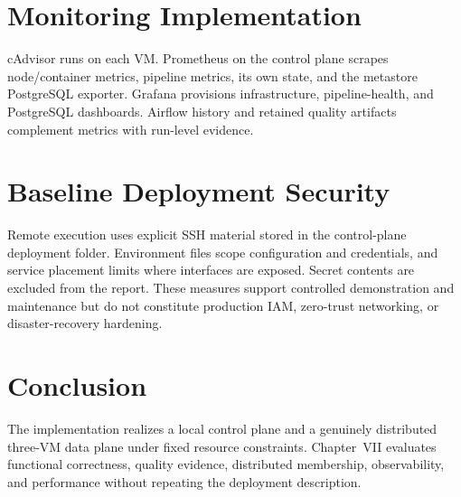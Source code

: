 \section{Monitoring Implementation}
cAdvisor runs on each VM. Prometheus on the control plane scrapes node/container metrics, pipeline metrics, its own state, and the metastore PostgreSQL exporter. Grafana provisions infrastructure, pipeline-health, and PostgreSQL dashboards. Airflow history and retained quality artifacts complement metrics with run-level evidence.

\section{Baseline Deployment Security}
Remote execution uses explicit SSH material stored in the control-plane deployment folder. Environment files scope configuration and credentials, and service placement limits where interfaces are exposed. Secret contents are excluded from the report. These measures support controlled demonstration and maintenance but do not constitute production IAM, zero-trust networking, or disaster-recovery hardening.

\section{Conclusion}
The implementation realizes a local control plane and a genuinely distributed three-VM data plane under fixed resource constraints. Chapter~VII evaluates functional correctness, quality evidence, distributed membership, observability, and performance without repeating the deployment description.
